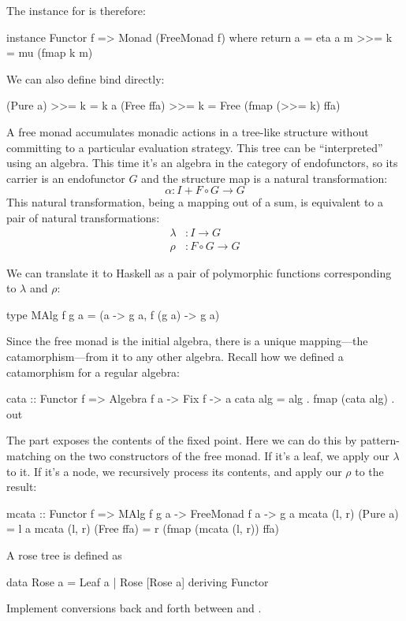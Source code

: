\documentclass[DaoFP]{subfiles}
\begin{document}
The  instance for  is therefore:
\begin{haskell}
instance Functor f => Monad (FreeMonad f) where
  return a = eta a
  m >>= k = mu (fmap k m)
\end{haskell}

We can also define bind directly:
\begin{haskell}
  (Pure a)   >>= k = k a
  (Free ffa) >>= k = Free (fmap (>>= k) ffa)
\end{haskell}

A free monad accumulates monadic actions in a tree-like structure without committing to a particular evaluation strategy. This tree can be ``interpreted'' using an algebra. This time it's an algebra in the category of endofunctors, so its carrier is an endofunctor $G$ and the structure map is a natural transformation:
\[ \alpha \colon I + F \circ G \to G\]
This natural transformation, being a mapping out of a sum, is equivalent to a pair of natural transformations:
\begin{align*}
\lambda &\colon I \to G
\\
\rho &\colon F \circ G \to G
\end{align*}

We can translate it to Haskell as a pair of polymorphic functions corresponding to $\lambda$ and $\rho$:
\begin{haskell}
type MAlg f g a = (a -> g a, f (g a) -> g a)
\end{haskell}

Since the free monad is the initial algebra, there is a unique mapping---the catamorphism---from it to any other algebra. Recall how we defined a catamorphism for a regular algebra:
\begin{haskell}
cata :: Functor f => Algebra f a -> Fix f -> a
cata alg = alg . fmap (cata alg) . out
\end{haskell}
The  part exposes the contents of the fixed point. Here we can do this by pattern-matching on the two constructors of the free monad. If it's a leaf, we apply our $\lambda$ to it. If it's a node, we recursively process its contents, and apply our $\rho$ to the result:
\begin{haskell}
mcata :: Functor f => MAlg f g a -> FreeMonad f a -> g a
mcata (l, r) (Pure a) = l a
mcata (l, r) (Free ffa) = 
  r (fmap (mcata (l, r)) ffa)
\end{haskell}

\begin{exercise}
A rose tree is defined as
\begin{haskell}
data Rose a = Leaf a | Rose [Rose a]
  deriving Functor
\end{haskell}
Implement conversions back and forth between  and  .
\end{exercise}
\end{document}
